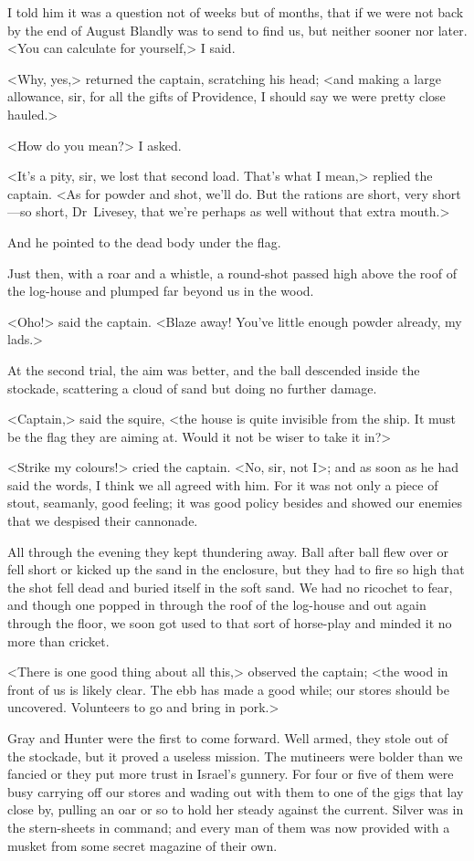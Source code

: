 I told him it was a question not of weeks but of months, that if we were not back by the end of August Blandly was to send to find us, but neither sooner nor later. <You can calculate for yourself,> I said.

<Why, yes,> returned the captain, scratching his head; <and making a large allowance, sir, for all the gifts of Providence, I should say we were pretty close hauled.>

<How do you mean?> I asked.

<It's a pity, sir, we lost that second load. That's what I mean,> replied the captain. <As for powder and shot, we'll do. But the rations are short, very short—so short, Dr~Livesey, that we're perhaps as well without that extra mouth.>

And he pointed to the dead body under the flag.

Just then, with a roar and a whistle, a round-shot passed high above the roof of the log-house and plumped far beyond us in the wood.

<Oho!> said the captain. <Blaze away! You've little enough powder already, my lads.>

At the second trial, the aim was better, and the ball descended inside the stockade, scattering a cloud of sand but doing no further damage.

<Captain,> said the squire, <the house is quite invisible from the ship. It must be the flag they are aiming at. Would it not be wiser to take it in?>

<Strike my colours!> cried the captain. <No, sir, not I>; and as soon as he had said the words, I think we all agreed with him. For it was not only a piece of stout, seamanly, good feeling; it was good policy besides and showed our enemies that we despised their cannonade.

All through the evening they kept thundering away. Ball after ball flew over or fell short or kicked up the sand in the enclosure, but they had to fire so high that the shot fell dead and buried itself in the soft sand. We had no ricochet to fear, and though one popped in through the roof of the log-house and out again through the floor, we soon got used to that sort of horse-play and minded it no more than cricket.

<There is one good thing about all this,> observed the captain; <the wood in front of us is likely clear. The ebb has made a good while; our stores should be uncovered. Volunteers to go and bring in pork.>

Gray and Hunter were the first to come forward. Well armed, they stole out of the stockade, but it proved a useless mission. The mutineers were bolder than we fancied or they put more trust in Israel's gunnery. For four or five of them were busy carrying off our stores and wading out with them to one of the gigs that lay close by, pulling an oar or so to hold her steady against the current. Silver was in the stern-sheets in command; and every man of them was now provided with a musket from some secret magazine of their own.

